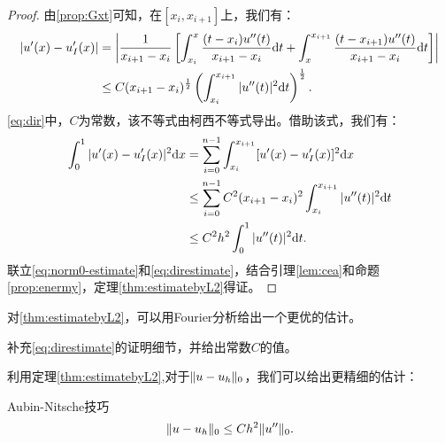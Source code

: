 \begin{proof}
  由\ref{prop:Gxt}可知，在$[x_{i},x_{i+1}]$上，我们有：
  \begin{equation}
    \label{eq:dir}
    \begin{aligned}
    |u'(x)-u_{I}'(x)|&=\left|\frac{1}{x_{i+1}-x_{i}}\left[\int_{x_{i}}^{x}\frac{(t-x_{i})u''(t)}{x_{i+1}-x_{i}}\mathrm{d} t+\int_{x}^{x_{i+1}}\frac{(t-x_{i+1})u''(t)}{x_{i+1}-x_{i}}\mathrm{d} t\right]\right|\\
    &\le C(x_{i+1}-x_{i})^{\frac{1}{2}}\left(\int_{x_{i}}^{x_{i+1}}|u''(t)|^{2}\mathrm{d} t\right)^{\frac{1}{2}}.
    \end{aligned}
  \end{equation}
  \eqref{eq:dir}中，$C$为常数，该不等式由柯西不等式导出。借助该式，我们有：
  \begin{equation}
    \label{eq:direstimate}
    \begin{aligned}
      \int_{0}^{1}|u'(x)-u_{I}'(x)|^{2}\mathrm{d} x&=\sum_{i=0}^{n-1}\int_{x_{i}}^{x_{i+1}}[u'(x)-u_{I}'(x)]^{2}\mathrm{d} x\\
      &\le\sum_{i=0}^{n-1}C^{2}(x_{i+1}-x_{i})^{2}\int_{x_{i}}^{x_{i+1}}|u''(t)|^{2}\mathrm{d} t\\
      &\le C^{2}h^{2}\int_{0}^{1}|u''(t)|^{2}\mathrm{d} t.
    \end{aligned}
  \end{equation}
  联立\eqref{eq:norm0-estimate}和\eqref{eq:direstimate}，结合引理\ref{lem:cea}和命题\ref{prop:enermy}，定理\ref{thm:estimatebyL2}得证。
\end{proof}
\begin{remark}
  对\ref{thm:estimatebyL2}，可以用Fourier分析给出一个更优的估计。
\end{remark}
\begin{exercise}
  补充\eqref{eq:direstimate}的证明细节，并给出常数$C$的值。
\end{exercise}
利用定理\ref{thm:estimatebyL2},对于$\|u-u_{h}\|_{0}$，我们可以给出更精细的估计：
\begin{theorem}{Aubin-Nitsche技巧}
  \begin{equation}
    \label{eq:AubinNitsche}
    \|u-u_{h}\|_{0}\le Ch^{2}\|u''\|_{0}.
  \end{equation}
\end{theorem}
